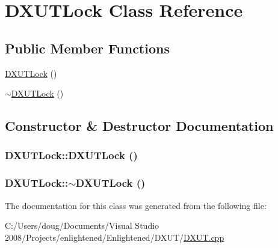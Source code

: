 \hypertarget{class_d_x_u_t_lock}{
\section{DXUTLock Class Reference}
\label{class_d_x_u_t_lock}
}
\subsection*{Public Member Functions}
\begin{DoxyCompactItemize}
\item 
\hyperlink{class_d_x_u_t_lock_a678d6c73eb9e2272b8c88d6bc7cd73e8}{DXUTLock} ()
\item 
\hyperlink{class_d_x_u_t_lock_a01eb826c51ec626dd0bdfc3d12f73549}{$\sim$DXUTLock} ()
\end{DoxyCompactItemize}


\subsection{Constructor \& Destructor Documentation}
\hypertarget{class_d_x_u_t_lock_a678d6c73eb9e2272b8c88d6bc7cd73e8}{
\subsubsection[{DXUTLock}]{\setlength{\rightskip}{0pt plus 5cm}DXUTLock::DXUTLock ()}}
\label{class_d_x_u_t_lock_a678d6c73eb9e2272b8c88d6bc7cd73e8}
\hypertarget{class_d_x_u_t_lock_a01eb826c51ec626dd0bdfc3d12f73549}{
\subsubsection[{$\sim$DXUTLock}]{\setlength{\rightskip}{0pt plus 5cm}DXUTLock::$\sim$DXUTLock ()}}
\label{class_d_x_u_t_lock_a01eb826c51ec626dd0bdfc3d12f73549}


The documentation for this class was generated from the following file:\begin{DoxyCompactItemize}
\item 
C:/Users/doug/Documents/Visual Studio 2008/Projects/enlightened/Enlightened/DXUT/\hyperlink{_d_x_u_t_8cpp}{DXUT.cpp}\end{DoxyCompactItemize}
